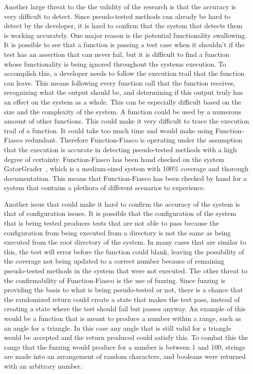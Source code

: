 Another large threat to the the validity of the research is that the accuracy is very difficult to detect. Since pseudo-tested methods can already be hard to detect by the developer, it is hard to confirm that the system that detects them is working accurately. One major reason is the potential functionality swallowing. It is possible to see that a function is passing a test case when it shouldn't if the test has an assertion that can never fail, but it is difficult to find a function whose functionality is being ignored throughout the systems execution. To accomplish this, a developer needs to follow the execution trail that the function can leave. This means following every function call that the function receives, recognizing what the output should be, and determining if this output truly has an effect on the system as a whole. This can be especially difficult based on the size and the complexity of the system. A function could be used by a numerous amount of other functions. This could make it very difficult to trace the execution trail of a function. It could take too much time and would make using Function-Fiasco redundant. Therefore Function-Fiasco is operating under the assumption that the execution is accurate in detecting pseudo-tested methods with a high degree of certainty. Function-Fiasco has been hand checked on the system GatorGrader~\cite{Gat}, which is a medium-sized system with 100\% coverage and thorough documentation. This means that Function-Fiasco has been checked by hand for a system that contains a plethora of different scenarios to experience.

Another issue that could make it hard to confirm the accuracy of the system is that of configuration issues. It is possible that the configuration of the system that is being tested produces tests that are not able to pass because the configuration from being executed from a directory is not the same as being executed from the root directory of the system. In many cases that are similar to this, the test will error before the function could blank, leaving the possibility of the coverage not being updated to a correct number because of remaining pseudo-tested methods in the system that were not executed. The other threat to the confirmability of Function-Fiasco is the use of fuzzing. Since fuzzing is providing the basis to what is being pseudo-tested or not, there is a chance that the randomized return could create a state that makes the test pass, instead of creating a state where the test should fail but passes anyway. An example of this would be a function that is meant to produce a number within a range, such as an angle for a triangle. In this case any angle that is still valid for a triangle would be accepted and the return produced could satisfy this. To combat this the range that the fuzzing would produce for a number is between 1 and 100, strings are made into an arrangement of random characters, and booleans were returned with an arbitrary number.

